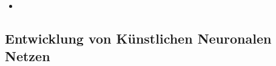 \documentclass[12pt,a4paper]{scrartcl}
\numberwithin{equation}{section}
\begin{document}
\begin{itemize}
	\item  
\end{itemize}

\subsection{Entwicklung von Künstlichen Neuronalen Netzen } \label{Entwicklung}

\end{document}
